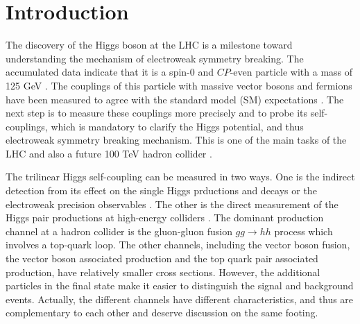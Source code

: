 \documentclass[a4paper,amsmath,preprintnumbers,showpacs,twocolumn,prl,superscriptaddress, nofootinbib]{revtex4}
\begin{document}
\section{Introduction}
The discovery of the Higgs boson at the LHC \cite{Aad:2012tfa,Chatrchyan:2012ufa} is a milestone 
toward  understanding the mechanism of electroweak symmetry breaking. 
The accumulated data indicate that it is a spin-$0$ and $CP$-even particle with a mass of 125 GeV \cite{Khachatryan:2014kca}.
The couplings of this particle with massive vector bosons and fermions have been measured to agree with the standard model (SM) expectations \cite{Aad:2013wqa,CMS-PAS-HIG-14-009}.
The next step is to measure these couplings  more precisely and to probe its self-couplings,
which is mandatory to clarify the Higgs potential, and thus electroweak symmetry breaking mechanism.
This is one of the main tasks of the LHC \cite{Djouadi:1999rca,Baur:2002rb,Baur:2002qd,Baur:2003gp,Dolan:2012rv,Papaefstathiou:2012qe,Baglio:2012np,Barger:2013jfa,Barr:2013tda,Dolan:2013rja,Englert:2014uqa,
Liu:2014rva,deLima:2014dta,ATL-PHYS-PUB-2014-019,CMS-PAS-FTR-15-002}
and also a future 100 TeV hadron collider
\cite{Yao:2013ika,Barr:2014sga,Li:2015yia,Azatov:2015oxa,Papaefstathiou:2015iba,Zhao:2016tai}.


The trilinear Higgs self-coupling can be measured in two ways.
One is the indirect detection from its effect on the single Higgs prductions and decays 
\cite{McCullough:2013rea,Castilla-Valdez:2015sng,Gorbahn:2016uoy,Degrassi:2016wml,Bizon:2016wgr,DiVita:2017eyz,Maltoni:2017ims}
or the electroweak precision observables \cite{Degrassi:2017ucl,Kribs:2017znd}.
The other is the direct measurement of the Higgs pair productions at high-energy colliders 
\cite{Djouadi:1999rca,Baur:2002rb,Baur:2002qd,Baur:2003gp,Dolan:2012rv,Papaefstathiou:2012qe,Baglio:2012np,Barger:2013jfa,Dolan:2013rja,Barr:2013tda,Yao:2013ika,Frederix:2014hta,deLima:2014dta,Englert:2014uqa,Liu:2014rva,Barr:2014sga,Li:2015yia,Azatov:2015oxa,Papaefstathiou:2015iba,Zhao:2016tai,Cao:2015oaa,Cao:2015oxx,Cao:2016zob}.
The dominant production channel at a hadron collider is the gluon-gluon fusion $gg\to hh$ process which involves a top-quark loop.
The other channels, including the vector boson fusion, the vector boson associated production and the top quark pair associated production,
have relatively smaller cross sections. 
However, the additional particles in the final state make it easier to distinguish the signal and background events.  Actually,  the different channels have different characteristics, and thus are complementary to each other and deserve discussion on the same footing. 
\end{document}
